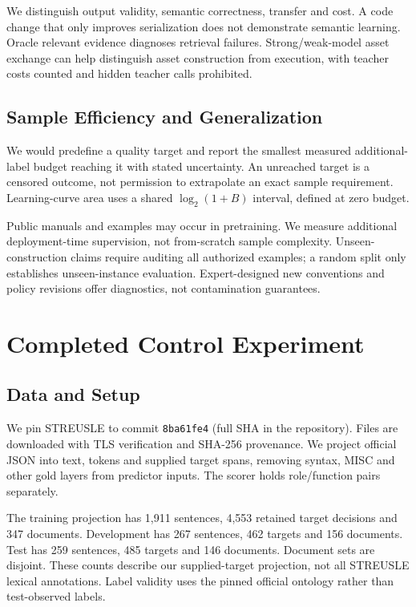 \documentclass[11pt]{article}
\begin{document}
We distinguish output validity, semantic correctness, transfer and cost. A code change that only improves serialization does not demonstrate semantic learning. Oracle relevant evidence diagnoses retrieval failures. Strong/weak-model asset exchange can help distinguish asset construction from execution, with teacher costs counted and hidden teacher calls prohibited.

\subsection{Sample Efficiency and Generalization}
We would predefine a quality target and report the smallest measured additional-label budget reaching it with stated uncertainty. An unreached target is a censored outcome, not permission to extrapolate an exact sample requirement. Learning-curve area uses a shared $\log_2(1+B)$ interval, defined at zero budget.

Public manuals and examples may occur in pretraining. We measure additional deployment-time supervision, not from-scratch sample complexity. Unseen-construction claims require auditing all authorized examples; a random split only establishes unseen-instance evaluation. Expert-designed new conventions and policy revisions offer diagnostics, not contamination guarantees.

\section{Completed Control Experiment}
\subsection{Data and Setup}
We pin STREUSLE \citep{streusle} to commit \texttt{8ba61fe4} (full SHA in the repository). Files are downloaded with TLS verification and SHA-256 provenance. We project official JSON into text, tokens and supplied target spans, removing syntax, MISC and other gold layers from predictor inputs. The scorer holds role/function pairs separately.

The training projection has 1,911 sentences, 4,553 retained target decisions and 347 documents. Development has 267 sentences, 462 targets and 156 documents. Test has 259 sentences, 485 targets and 146 documents. Document sets are disjoint. These counts describe our supplied-target projection, not all STREUSLE lexical annotations. Label validity uses the pinned official ontology rather than test-observed labels.
\end{document}

